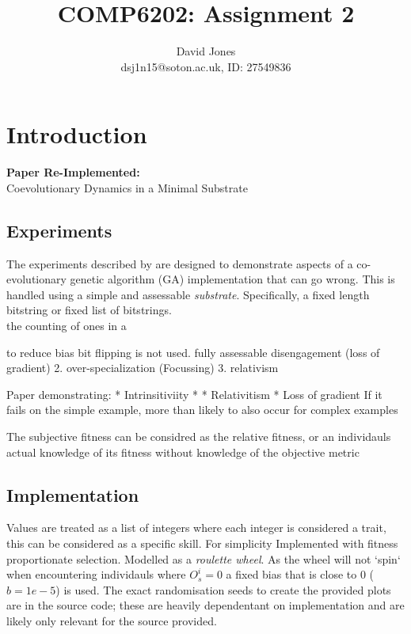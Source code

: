 \documentclass[11pt,a4paper]{article}
\title{COMP6202: Assignment 2}
\author{
David Jones \\
dsj1n15@soton.ac.uk, ID: 27549836}
\date{}
\begin{document}
\maketitle
\section{Introduction}
\textbf{Paper Re-Implemented:}\\
Coevolutionary Dynamics in a Minimal Substrate \parencite{Watson:2001}
\subsection{Experiments}
The experiments described by \cite{Watson:2001} are designed to demonstrate aspects of a co-evolutionary genetic algorithm (GA) implementation that can go wrong. This is handled using a simple and assessable \textit{substrate}. Specifically, a fixed length bitstring or fixed list of bitstrings.\\

\noindent the counting of ones in a 


to reduce bias bit flipping is not used.
fully assessable 
disengagement (loss of gradient)
2. over-specialization (Focussing)
3. relativism


Paper demonstrating:
* Intrinsitiviity
* 
* Relativitism
* Loss of gradient
If it fails on the simple example, more than likely to also occur for complex examples

The subjective fitness can be considred as the relative fitness, or an individauls actual knowledge of its fitness without knowledge of the objective metric

\subsection{Implementation}
Values are treated as a list of integers where each integer is considered a trait, this can
be considered as a specific skill. For simplicity 
Implemented with fitness proportionate selection. Modelled as a \textit{roulette wheel}. As the wheel will not `spin` when encountering individauls where $O_s^i=0$ a fixed bias that is close to 0 ($b = 1e-5$) is used.
The exact randomisation seeds to create the provided plots are in the source code; these are heavily dependentant on implementation and are likely only relevant for the source provided.
\end{document}
